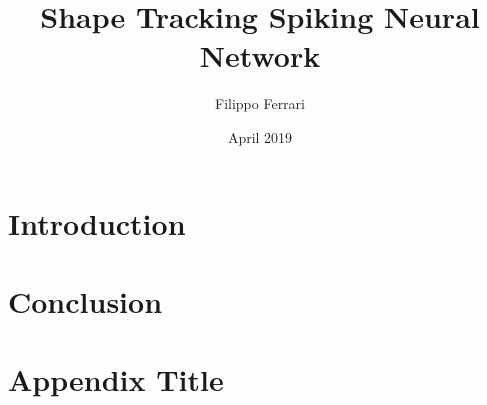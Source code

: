 \documentclass[12pt]{report}
\title{Shape Tracking Spiking Neural Network}
\author{Filippo Ferrari}
\date{April 2019}
\begin{document}






\tableofcontents

\listoffigures

\listoftables

\chapter{Introduction}



\chapter{Conclusion}


\appendix
\chapter{Appendix Title}


%

\printbibliography
\end{document}
